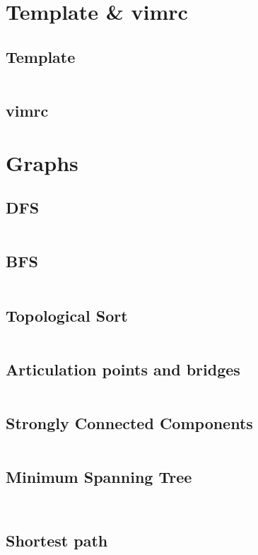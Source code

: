 \documentclass[a4paper, 10pt, twocolumn, landscape]{article}
\begin{document}
  \pagestyle{fancy}

  \setlength{\columnseprule}{1pt}
  \large

  \tableofcontents

  \section{Template & vimrc}
  \subsection{Template}
  \inputminted{cpp}{template.cpp}
  \subsection{vimrc}
  

  \section{Graphs}
  \subsection{DFS}
  \inputminted{cpp}{graphs/dfs.cpp}
  \subsection{BFS}
  \inputminted{cpp}{graphs/bfs.cpp}
  \subsection{Topological Sort}
  \inputminted{cpp}{graphs/kahn.cpp}
  \subsection{Articulation points and bridges}
  \inputminted{cpp}{graphs/articulation.cpp}
  \subsection{Strongly Connected Components}
  \inputminted{cpp}{graphs/kosaraju.cpp}
  \subsection{Minimum Spanning Tree}
  \inputminted{cpp}{graphs/kruskal.cpp}
  \inputminted{cpp}{graphs/prim.cpp}
  \subsection{Shortest path}
  \inputminted{cpp}{graphs/dijkstra.cpp}
  \inputminted{cpp}{graphs/bellman-ford.cpp}
  \inputminted{cpp}{graphs/spfa.cpp}
  \inputminted{cpp}{graphs/floyd-warshall.cpp}
\end{document}
